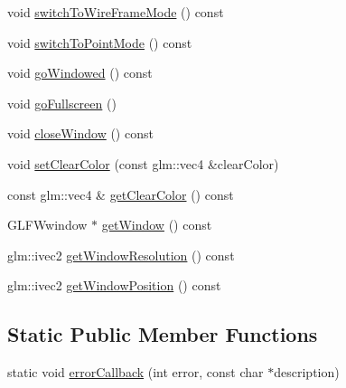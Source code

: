 \begin{DoxyCompactItemize}
void \mbox{\hyperlink{classec_1_1_window_a85be553f3f877b77ac70db32b9f8a8f6}{switch\+To\+Wire\+Frame\+Mode}} () const
\item 
void \mbox{\hyperlink{classec_1_1_window_a633ebdd1e469a3a865f4748b99f9c664}{switch\+To\+Point\+Mode}} () const
\item 
void \mbox{\hyperlink{classec_1_1_window_aeeaa47b1f8199b4df60f74aa3b2c45f7}{go\+Windowed}} () const
\item 
void \mbox{\hyperlink{classec_1_1_window_ab89e0e27d169da6f5d9430b78c77c0ee}{go\+Fullscreen}} ()
\item 
void \mbox{\hyperlink{classec_1_1_window_aa38b17b4251dee392623910a378f60c3}{close\+Window}} () const
\item 
void \mbox{\hyperlink{classec_1_1_window_a915c4b64dde5f2274e59c40bc10eff58}{set\+Clear\+Color}} (const glm\+::vec4 \&clear\+Color)
\item 
const glm\+::vec4 \& \mbox{\hyperlink{classec_1_1_window_a4355925b4898e5b032da048eec86f103}{get\+Clear\+Color}} () const
\item 
G\+L\+F\+Wwindow $\ast$ \mbox{\hyperlink{classec_1_1_window_abe525ce2f27fecf298b1ad0926024ae3}{get\+Window}} () const
\item 
glm\+::ivec2 \mbox{\hyperlink{classec_1_1_window_a8b44b42e9cc6e8aa1d41c0bc01543977}{get\+Window\+Resolution}} () const
\item 
glm\+::ivec2 \mbox{\hyperlink{classec_1_1_window_accf3c652040d022bdd953ed69aec0df5}{get\+Window\+Position}} () const
\end{DoxyCompactItemize}
\subsection*{Static Public Member Functions}
\begin{DoxyCompactItemize}
\item 
static void \mbox{\hyperlink{classec_1_1_window_a1d202aaa954ea0b62cf380fb48288107}{error\+Callback}} (int error, const char $\ast$description)
\end{DoxyCompactItemize}
